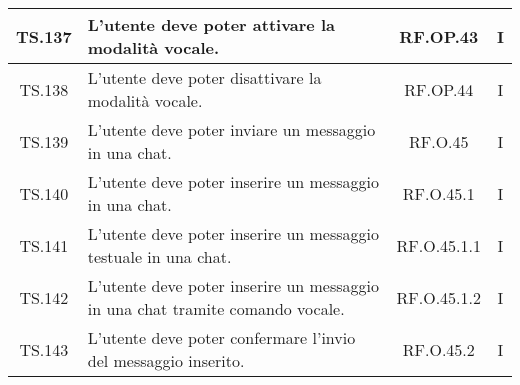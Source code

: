 {{{{{{{{{\begin{xltabular}{\textwidth}{|c|X|c|c|}
    \hline
    TS.137 & L’utente deve poter attivare la modalità vocale. & RF.OP.43 & I \\
    \hline
    TS.138 & L’utente deve poter disattivare la modalità vocale. & RF.OP.44 & I \\
    \hline
    TS.139 & L’utente deve poter inviare un messaggio in una chat. & RF.O.45 & I \\
    \hline
    TS.140 & L’utente deve poter inserire un messaggio in una chat. & RF.O.45.1 & I \\
    \hline
    TS.141 & L’utente deve poter inserire un messaggio testuale in una chat. & RF.O.45.1.1 & I \\
    \hline
    TS.142 & L’utente deve poter inserire un messaggio in una chat tramite comando vocale. & RF.O.45.1.2 & I \\
    \hline
    TS.143 & L’utente deve poter confermare l’invio del messaggio inserito. & RF.O.45.2 & I \\
    \end{xltabular}
    }

    
}}}}}}}}
